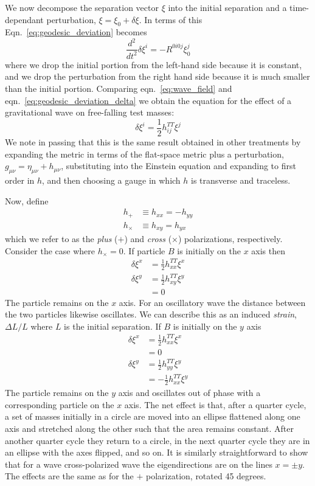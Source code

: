 We now decompose the separation vector $\xi$ into the initial
separation and a time-dependant perturbation, $\xi = \xi_0 + \delta
\xi$.  In terms of this Eqn.~\ref{eq:geodesic_deviation} becomes
%
\begin{equation}
\label{eq:geodesic_deviation_delta}
\frac{d^2}{dt^2} \delta \xi^i = -R^{0 i 0 j} \xi_0^j
\end{equation}
%
where we drop the initial portion from the left-hand side because it
is constant, and we drop the perturbation from the right hand side
because it is much smaller than the initial portion.  Comparing
eqn.~\ref{eq:wave_field} and eqn.~\ref{eq:geodesic_deviation_delta}
we obtain the equation for the effect of a gravitational wave on
free-falling test masses:
%
\begin{equation}
\label{eq:wave_effect}
\delta \xi^i = \frac{1}{2} h^{TT}_{ij} \xi^j
\end{equation}
%
We note in passing that this is the same result obtained in other
treatments by expanding the metric in terms of the flat-space metric
plus a perturbation, $g_{\mu\nu} = \eta_{\mu\nu} + h_{\mu\nu}$,
substituting into the Einstein equation and expanding to first order
in $h$, and then choosing a gauge in which $h$ is transverse and
traceless.

Now, define
%
\begin{align*}
h_+ &\equiv h_{xx} = - h_{yy} \\
h_\times &\equiv h_{xy} = h_{yx}
\end{align*}
%
which we refer to as the \emph{plus} ($+$) and \emph{cross} ($\times$)
polarizations, respectively.  Consider the case where $h_\times = 0$.
If particle $B$ is initially on the $x$ axis then 
%
\begin{align*}
\delta \xi^x &= \frac{1}{2} h^{TT}_{xx} \xi^x \\
\delta \xi^y &= \frac{1}{2} h^{TT}_{xy} \xi^y \\
&= 0
\end{align*}
%
The particle remains on the $x$ axis.  For an oscillatory wave the
distance between the two particles likewise oscillates.  We can
describe this as an induced \emph{strain}, $\Delta L/L$ where $L$ is
the initial separation.  If $B$ is initially on the $y$ axis
%
\begin{align*}
\delta \xi^x &= \frac{1}{2} h^{TT}_{xx} \xi^x \\
&= 0 \\
\delta \xi^y &= \frac{1}{2} h^{TT}_{yy} \xi^y \\
&= - \frac{1}{2} h^{TT}_{xx} \xi^y
\end{align*}
%
The particle remains on the $y$ axis and oscillates out of phase with
a corresponding particle on the $x$ axis.  The net effect is that,
after a quarter cycle, a set of masses initially in a circle are moved
into an ellipse flattened along one axis and stretched along the other
such that the area remains constant.  After another quarter cycle they
return to a circle, in the next quarter cycle they are in an ellipse
with the axes flipped, and so on. It is similarly straightforward to
show that for a wave cross-polarized wave the eigendirections are on
the lines $x=\pm y$.  The effects are the same as for the $+$
polarization, rotated 45 degrees.

